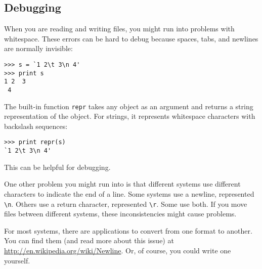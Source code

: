 \documentclass{article}
\begin{document}
\begin{multicols}{2}
\subsection{Debugging} %
When you are reading and writing files, you might run into problems
with whitespace. These errors can be hard to debug because spaces,
tabs, and newlines are normally invisible:
\begin{lstlisting}
>>> s = `1 2\t 3\n 4'
>>> print s
1 2  3
 4
\end{lstlisting}
The built-in function \verb|repr| takes any object as an argument and
returns a string representation of the object. For strings, it
represents whitespace characters with backslash sequences:
\begin{lstlisting}
>>> print repr(s)
`1 2\t 3\n 4'
\end{lstlisting}
This can be helpful for debugging.

One other problem you might run into is that different systems use
different characters to indicate the end of a line. Some systems use a
newline, represented \verb|\n|. Others use a return character, represented
\verb|\r|. Some use both. If you move files between different systems, these
inconsistencies might cause problems.

For most systems, there are applications to convert from one format to
another. You can find them (and read more about this issue) at
\url{http://en.wikipedia.org/wiki/Newline}. Or, of course, you could write
one yourself.
\end{multicols}

\newpage  %
\end{document}
